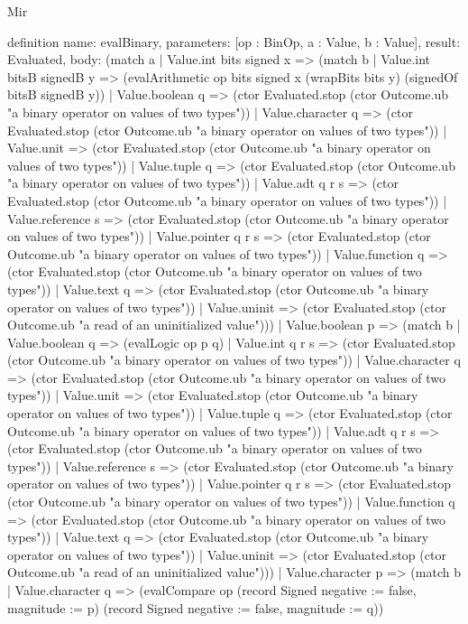 \begin{lexlean}{Mir}
\begin{semanticmodule}
definition{
  name: evalBinary,
  parameters: [op : BinOp, a : Value, b : Value],
  result: Evaluated,
  body: (match a
    | Value.int bits signed x => (match b
      | Value.int bitsB signedB y => (evalArithmetic op bits signed x (wrapBits bits y) (signedOf bitsB signedB y))
      | Value.boolean q => (ctor Evaluated.stop (ctor Outcome.ub "a binary operator on values of two types"))
      | Value.character q => (ctor Evaluated.stop (ctor Outcome.ub "a binary operator on values of two types"))
      | Value.unit => (ctor Evaluated.stop (ctor Outcome.ub "a binary operator on values of two types"))
      | Value.tuple q => (ctor Evaluated.stop (ctor Outcome.ub "a binary operator on values of two types"))
      | Value.adt q r s => (ctor Evaluated.stop (ctor Outcome.ub "a binary operator on values of two types"))
      | Value.reference s => (ctor Evaluated.stop (ctor Outcome.ub "a binary operator on values of two types"))
      | Value.pointer q r s => (ctor Evaluated.stop (ctor Outcome.ub "a binary operator on values of two types"))
      | Value.function q => (ctor Evaluated.stop (ctor Outcome.ub "a binary operator on values of two types"))
      | Value.text q => (ctor Evaluated.stop (ctor Outcome.ub "a binary operator on values of two types"))
      | Value.uninit => (ctor Evaluated.stop (ctor Outcome.ub "a read of an uninitialized value")))
    | Value.boolean p => (match b
      | Value.boolean q => (evalLogic op p q)
      | Value.int q r s => (ctor Evaluated.stop (ctor Outcome.ub "a binary operator on values of two types"))
      | Value.character q => (ctor Evaluated.stop (ctor Outcome.ub "a binary operator on values of two types"))
      | Value.unit => (ctor Evaluated.stop (ctor Outcome.ub "a binary operator on values of two types"))
      | Value.tuple q => (ctor Evaluated.stop (ctor Outcome.ub "a binary operator on values of two types"))
      | Value.adt q r s => (ctor Evaluated.stop (ctor Outcome.ub "a binary operator on values of two types"))
      | Value.reference s => (ctor Evaluated.stop (ctor Outcome.ub "a binary operator on values of two types"))
      | Value.pointer q r s => (ctor Evaluated.stop (ctor Outcome.ub "a binary operator on values of two types"))
      | Value.function q => (ctor Evaluated.stop (ctor Outcome.ub "a binary operator on values of two types"))
      | Value.text q => (ctor Evaluated.stop (ctor Outcome.ub "a binary operator on values of two types"))
      | Value.uninit => (ctor Evaluated.stop (ctor Outcome.ub "a read of an uninitialized value")))
    | Value.character p => (match b
      | Value.character q => (evalCompare op (record Signed {negative := false, magnitude := p}) (record Signed {negative := false, magnitude := q}))
}
\end{semanticmodule}
\end{lexlean}
